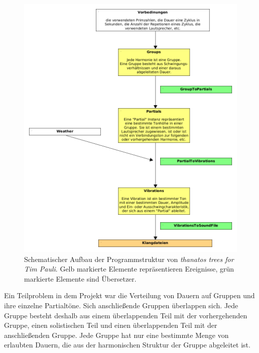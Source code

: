 \documentclass[12pt,a4paper,ngerman]{article}
\begin{document}
\begin{figure}[h!]
    \begin{center}
        \includegraphics[scale=0.5]{pictures/thantostrees-for-timpauli-mutwo-structure.png}
    \end{center}
    \caption{%
        Schematischer Aufbau der Programmstruktur von \emph{thanatos trees for Tim Pauli}.
        Gelb markierte Elemente repräsentieren Ereignisse, grün markierte Elemente sind Übersetzer.
    }
    \label{fig:thanatosMutwoStructure}
\end{figure}

Ein Teilproblem in dem Projekt war die Verteilung von Dauern auf Gruppen und ihre einzelne Partialtöne.
Sich anschließende Gruppen überlappen sich.
Jede Gruppe besteht deshalb aus einem überlappenden Teil mit der vorhergehenden Gruppe, einen solistischen Teil und einen überlappenden Teil mit der anschließenden Gruppe.
Jede Gruppe hat nur eine bestimmte Menge von erlaubten Dauern, die aus der harmonischen Struktur der Gruppe abgeleitet ist.
\end{document}
